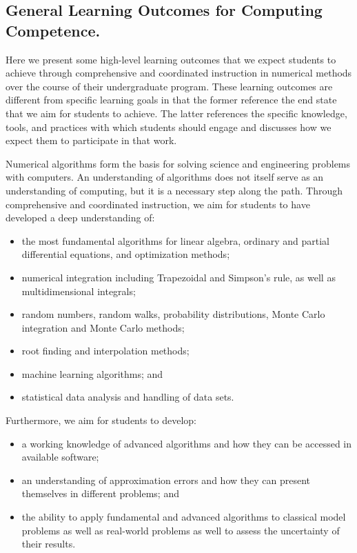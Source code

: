 \documentclass[graybox,envcountchap,sectrefs]{svmult}
\begin{document}
\subsection{General Learning Outcomes for Computing Competence.}

Here we present some high-level learning outcomes that we expect
students to achieve through comprehensive and coordinated instruction
in numerical methods over the course of their undergraduate
program. These learning outcomes are different from specific learning
goals in that the former reference the end state that we aim for
students to achieve. The latter references the specific knowledge,
tools, and practices with which students should engage and discusses
how we expect them to participate in that work.

Numerical algorithms form the basis for solving science and
engineering problems with computers. An understanding of algorithms
does not itself serve as an understanding of computing, but it is a
necessary step along the path. Through comprehensive and coordinated
instruction, we aim for students to have developed a deep understanding of:

\begin{itemize}
\item the most fundamental algorithms for linear algebra, ordinary and partial differential equations, and optimization methods;

\item numerical integration including Trapezoidal and Simpson's rule, as well as multidimensional integrals;

\item random numbers, random walks, probability distributions, Monte Carlo integration and Monte Carlo methods;

\item root finding and interpolation methods;

\item machine learning algorithms; and

\item statistical data analysis and handling of data sets.

\end{itemize}

Furthermore, we aim for students to develop:

\begin{itemize}

\item a working knowledge of advanced algorithms and how they can be accessed in available software;

\item an understanding of approximation errors and how they can present themselves in different problems; and

\item the ability to apply fundamental and advanced algorithms to classical model problems as well as real-world problems as well to assess the uncertainty of their results.
\end{itemize}
\end{document}
